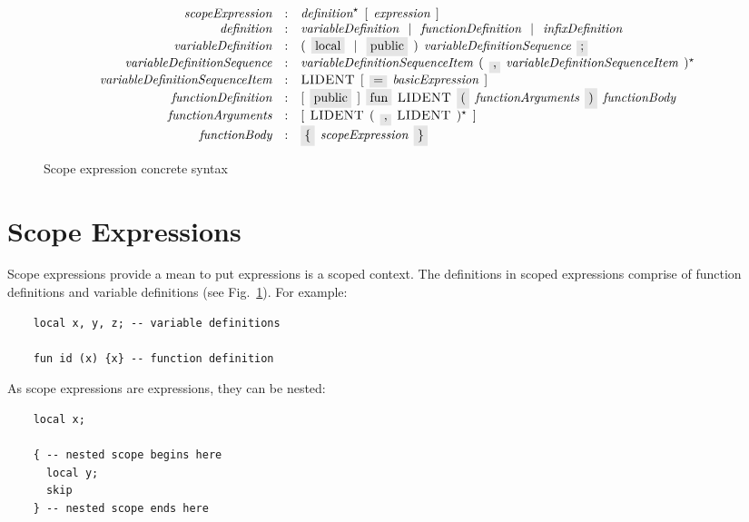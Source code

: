 \begin{figure}[t]
  \[
    \begin{array}{rcl}
      \defterm{scopeExpression}                & : & \nonterm{definition}^\star\s[\s\nonterm{expression}\s]\\
      \defterm{definition}                     & : & \nonterm{variableDefinition}\alt\nonterm{functionDefinition}\alt\nonterm{infixDefinition}\\
      \defterm{variableDefinition}             & : & (\s\term{local}\alt\term{public}\s)\s\nonterm{variableDefinitionSequence}\s\term{;}\\
      \defterm{variableDefinitionSequence}     & : & \nonterm{variableDefinitionSequenceItem}\s(\s\term{,}\s\nonterm{variableDefinitionSequenceItem}\s)^\star\\
      \defterm{variableDefinitionSequenceItem} & : & \token{LIDENT}\s[\s\term{=}\s\nonterm{basicExpression}\s]\\
      \defterm{functionDefinition}             & : & [\s\term{public}\s]\s\term{fun}\s\token{LIDENT}\s\term{(}\s\nonterm{functionArguments}\s\term{)}\s\nonterm{functionBody}\\
      \defterm{functionArguments}              & : & [\s\token{LIDENT}\s(\s\term{,}\s\token{LIDENT}\s)^\star\s]\\
      \defterm{functionBody}                   & : & \term{\{}\s\nonterm{scopeExpression}\s\term{\}}
    \end{array}
  \]
  \caption{Scope expression concrete syntax}
  \label{scope_expression}
\end{figure}

\section{Scope Expressions}
\label{sec:scope_expressions}

Scope expressions provide a mean to put expressions is a scoped context. The definitions in scoped expressions comprise of function definitions and
variable definitions (see Fig.~\ref{scope_expression}). For example:

\begin{lstlisting}
    local x, y, z; -- variable definitions

    fun id (x) {x} -- function definition
\end{lstlisting}

As scope expressions are expressions, they can be nested:

\begin{lstlisting}
    local x;

    { -- nested scope begins here
      local y;
      skip
    } -- nested scope ends here
\end{lstlisting}

